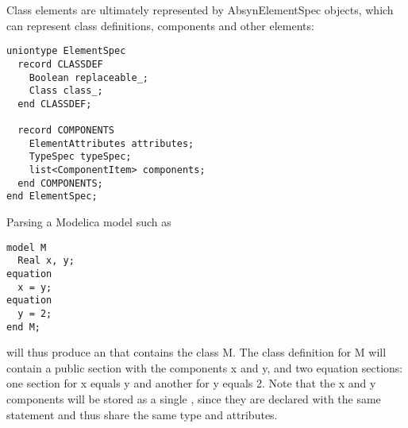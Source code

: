 Class elements are ultimately represented by {Absyn}{ElementSpec} objects, which
can represent class definitions, components and other elements:
\begin{lstlisting}[language=modelica]
uniontype ElementSpec
  record CLASSDEF
    Boolean replaceable_;
    Class class_;
  end CLASSDEF;

  record COMPONENTS
    ElementAttributes attributes;
    TypeSpec typeSpec;
    list<ComponentItem> components;
  end COMPONENTS;
end ElementSpec;
\end{lstlisting}
Parsing a Modelica model such as
\begin{lstlisting}[language=modelica]
model M
  Real x, y;
equation
  x = y;
equation
  y = 2;
end M;
\end{lstlisting}
will thus produce an  that contains the class M. The class
definition for M will contain a public section with the components x and y, and
two equation sections: one section for x equals y and another for y equals 2. 
Note that the x and y components will be stored as a single
, since they are declared with the same
statement and thus share the same type and attributes.

